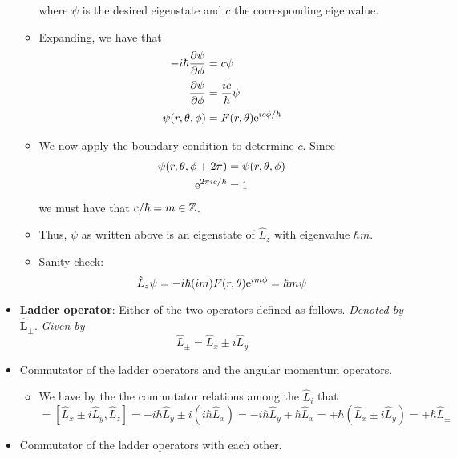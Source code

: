 \documentclass[../notes.tex]{subfiles}
\begin{document}
\begin{itemize}
\begin{itemize}
        where $\psi$ is the desired eigenstate and $c$ the corresponding eigenvalue.
        \item Expanding, we have that
        \begin{align*}
            -i\hbar\pdv{\psi}{\phi} &= c\psi\\
            \pdv{\psi}{\phi} &= \frac{ic}{\hbar}\psi\\
            \psi(r,\theta,\phi) &= F(r,\theta)\e[ic\phi/\hbar]
        \end{align*}
        \item We now apply the boundary condition to determine $c$. Since
        \begin{align*}
            \psi(r,\theta,\phi+2\pi) &= \psi(r,\theta,\phi)\\
            \e[2\pi ic/\hbar] &= 1
        \end{align*}
        we must have that $c/\hbar=m\in\Z$.
        \item Thus, $\psi$ as written above is an eigenstate of $\hat{L}_z$ with eigenvalue $\hbar m$.
        \item Sanity check:
        \begin{equation*}
            \hat{L}_z\psi = -i\hbar(im)F(r,\theta)\e[im\phi]
            = \hbar m\psi
        \end{equation*}
    \end{itemize}
    \item \textbf{Ladder operator}: Either of the two operators defined as follows. \emph{Denoted by} $\bm{\hat{L}_\pm}$. \emph{Given by}
    \begin{equation*}
        \hat{L}_\pm = \hat{L}_x\pm i\hat{L}_y
    \end{equation*}
    \item Commutator of the ladder operators and the angular momentum operators.
    \begin{itemize}
        \item We have by the the commutator relations among the $\hat{L}_i$ that
        \begin{equation*}
            [\hat{L}_\pm,\hat{L}_z] = [\hat{L}_x\pm i\hat{L}_y,\hat{L}_z]
            = -i\hbar\hat{L}_y\pm i(i\hbar\hat{L}_x)
            = -i\hbar\hat{L}_y\mp\hbar\hat{L}_x
            = \mp\hbar(\hat{L}_x\pm i\hat{L}_y)
            = \mp\hbar\hat{L}_\pm
        \end{equation*}
    \end{itemize}
    \item Commutator of the ladder operators with each other.

\end{itemize}
\end{document}
